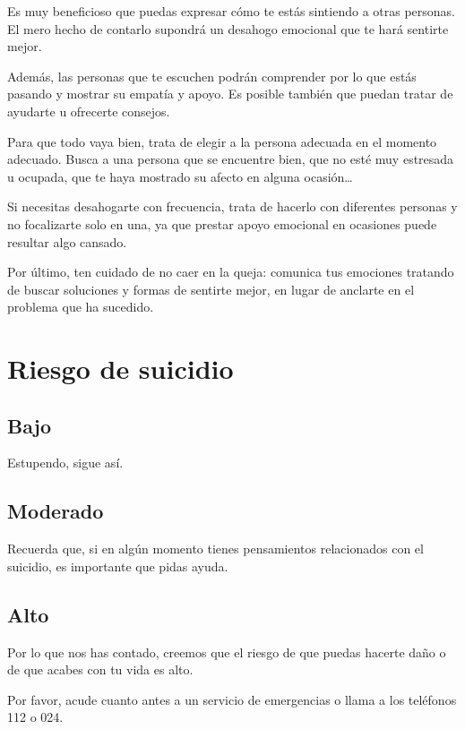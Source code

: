             Es muy beneficioso que puedas expresar cómo te estás sintiendo a otras personas. El mero hecho de 
            contarlo supondrá un desahogo emocional que te hará sentirte mejor.
            
            Además, las personas que te escuchen podrán comprender por lo que estás pasando y mostrar su empatía 
            y apoyo. Es posible también que puedan tratar de ayudarte u ofrecerte consejos.
            
            Para que todo vaya bien, trata de elegir a la persona adecuada en el momento adecuado. Busca a una 
            persona que se encuentre bien, que no esté muy estresada u ocupada, que te haya mostrado su afecto 
            en alguna ocasión…
            
            Si necesitas desahogarte con frecuencia, trata de hacerlo con diferentes personas y no focalizarte 
            solo en una, ya que prestar apoyo emocional en ocasiones puede resultar algo cansado.
           
            Por último, ten cuidado de no caer en la queja: comunica tus emociones tratando de buscar soluciones 
            y formas de sentirte mejor, en lugar de anclarte en el problema que ha sucedido.
    
    \section{Riesgo de suicidio}
        \subsection{Bajo}
            Estupendo, sigue así. 
        \subsection{Moderado}
            Recuerda que, si en algún momento tienes pensamientos relacionados con el suicidio, es importante que 
            pidas ayuda.

        \subsection{Alto}
            Por lo que nos has contado, creemos que el riesgo de que puedas hacerte daño o de que acabes con tu vida 
            es alto.

            Por favor, acude cuanto antes a un servicio de emergencias o llama a los teléfonos 112 o 024. 
            
